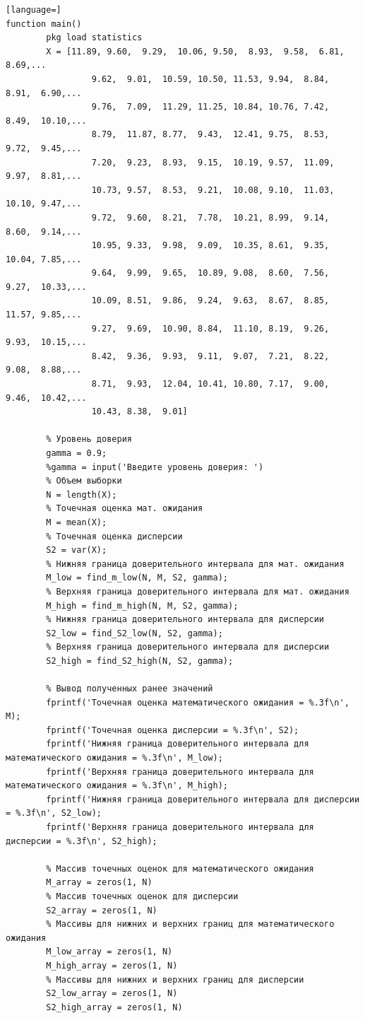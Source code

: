 \documentclass[12pt]{report}
\begin{document}
\begin{lstlisting}[language=]
function main()
		pkg load statistics
		X = [11.89, 9.60,  9.29,  10.06, 9.50,  8.93,  9.58,  6.81,  8.69,...
				 9.62,  9.01,  10.59, 10.50, 11.53, 9.94,  8.84,  8.91,  6.90,...
				 9.76,  7.09,  11.29, 11.25, 10.84, 10.76, 7.42,  8.49,  10.10,...
				 8.79,  11.87, 8.77,  9.43,  12.41, 9.75,  8.53,  9.72,  9.45,...
				 7.20,  9.23,  8.93,  9.15,  10.19, 9.57,  11.09, 9.97,  8.81,...
				 10.73, 9.57,  8.53,  9.21,  10.08, 9.10,  11.03, 10.10, 9.47,...
				 9.72,  9.60,  8.21,  7.78,  10.21, 8.99,  9.14,  8.60,  9.14,...
				 10.95, 9.33,  9.98,  9.09,  10.35, 8.61,  9.35,  10.04, 7.85,...
				 9.64,  9.99,  9.65,  10.89, 9.08,  8.60,  7.56,  9.27,  10.33,...
				 10.09, 8.51,  9.86,  9.24,  9.63,  8.67,  8.85,  11.57, 9.85,...
				 9.27,  9.69,  10.90, 8.84,  11.10, 8.19,  9.26,  9.93,  10.15,...
				 8.42,  9.36,  9.93,  9.11,  9.07,  7.21,  8.22,  9.08,  8.88,...
				 8.71,  9.93,  12.04, 10.41, 10.80, 7.17,  9.00,  9.46,  10.42,...
				 10.43, 8.38,  9.01]
		
		% Уровень доверия
		gamma = 0.9;
		%gamma = input('Введите уровень доверия: ')
		% Объем выборки 
		N = length(X);
		% Точечная оценка мат. ожидания
		M = mean(X);
		% Точечная оценка дисперсии
		S2 = var(X);
		% Нижняя граница доверительного интервала для мат. ожидания
		M_low = find_m_low(N, M, S2, gamma);
		% Верхняя граница доверительного интервала для мат. ожидания
		M_high = find_m_high(N, M, S2, gamma);
		% Нижняя граница доверительного интервала для дисперсии
		S2_low = find_S2_low(N, S2, gamma);
		% Верхняя граница доверительного интервала для дисперсии
		S2_high = find_S2_high(N, S2, gamma);
		
		% Вывод полученных ранее значений
		fprintf('Точечная оценка математического ожидания = %.3f\n', M);
		fprintf('Точечная оценка дисперсии = %.3f\n', S2);
		fprintf('Нижняя граница доверительного интервала для математического ожидания = %.3f\n', M_low);
		fprintf('Верхняя граница доверительного интервала для математического ожидания = %.3f\n', M_high);
		fprintf('Нижняя граница доверительного интервала для дисперсии = %.3f\n', S2_low);
		fprintf('Верхняя граница доверительного интервала для дисперсии = %.3f\n', S2_high);
		
		% Массив точечных оценок для математического ожидания
		M_array = zeros(1, N)
		% Массив точечных оценок для дисперсии
		S2_array = zeros(1, N)
		% Массивы для нижних и верхних границ для математического ожидания
		M_low_array = zeros(1, N)
		M_high_array = zeros(1, N)
		% Массивы для нижних и верхних границ для дисперсии
		S2_low_array = zeros(1, N)
		S2_high_array = zeros(1, N)
		

\end{lstlisting}
\end{document}
